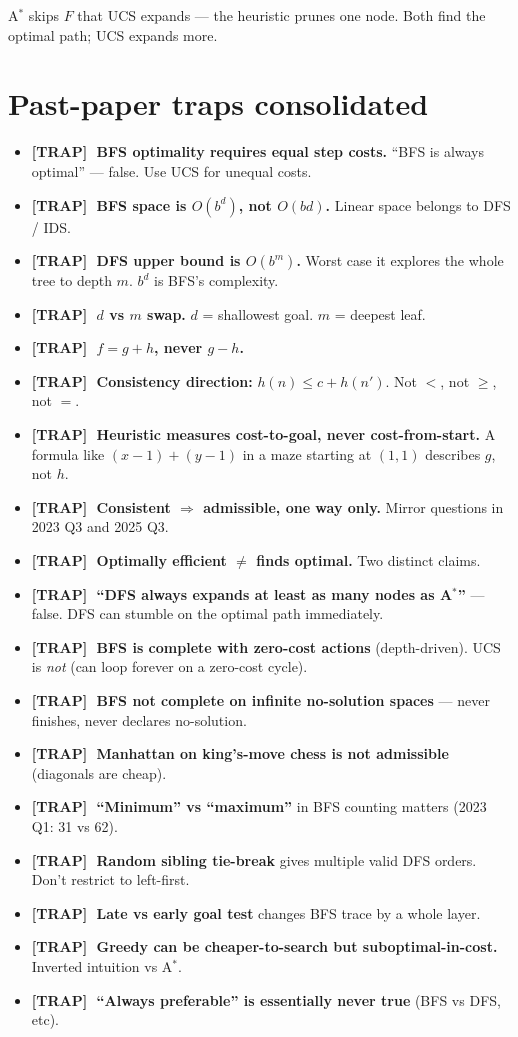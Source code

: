 \documentclass[11pt, a4paper]{article}
\newcommand{\trapflag}{\textcolor{trapBd}{\textbf{[TRAP]}}\,}
\begin{document}
A$^{*}$ skips $F$ that UCS expands --- the heuristic prunes one node. Both find the optimal path; UCS expands more.

\section{Past-paper traps consolidated}

\begin{itemize}
  \item \trapflag\ \textbf{BFS optimality requires equal step costs.} ``BFS is always optimal'' --- false. Use UCS for unequal costs.
  \item \trapflag\ \textbf{BFS space is $O(b^d)$, not $O(bd)$.} Linear space belongs to DFS / IDS.
  \item \trapflag\ \textbf{DFS upper bound is $O(b^m)$.} Worst case it explores the whole tree to depth $m$. $b^d$ is BFS's complexity.
  \item \trapflag\ \textbf{$d$ vs $m$ swap.} $d$ = shallowest goal. $m$ = deepest leaf.
  \item \trapflag\ \textbf{$f = g + h$, never $g - h$.}
  \item \trapflag\ \textbf{Consistency direction:} $h(n) \le c + h(n')$. Not $<$, not $\ge$, not $=$.
  \item \trapflag\ \textbf{Heuristic measures cost-to-goal, never cost-from-start.} A formula like $(x{-}1)+(y{-}1)$ in a maze starting at $(1,1)$ describes $g$, not $h$.
  \item \trapflag\ \textbf{Consistent $\Rightarrow$ admissible, one way only.} Mirror questions in 2023 Q3 and 2025 Q3.
  \item \trapflag\ \textbf{Optimally efficient $\neq$ finds optimal.} Two distinct claims.
  \item \trapflag\ \textbf{``DFS always expands at least as many nodes as A$^{*}$''} --- false. DFS can stumble on the optimal path immediately.
  \item \trapflag\ \textbf{BFS is complete with zero-cost actions} (depth-driven). UCS is \emph{not} (can loop forever on a zero-cost cycle).
  \item \trapflag\ \textbf{BFS not complete on infinite no-solution spaces} --- never finishes, never declares no-solution.
  \item \trapflag\ \textbf{Manhattan on king's-move chess is not admissible} (diagonals are cheap).
  \item \trapflag\ \textbf{``Minimum'' vs ``maximum''} in BFS counting matters (2023 Q1: 31 vs 62).
  \item \trapflag\ \textbf{Random sibling tie-break} gives multiple valid DFS orders. Don't restrict to left-first.
  \item \trapflag\ \textbf{Late vs early goal test} changes BFS trace by a whole layer.
  \item \trapflag\ \textbf{Greedy can be cheaper-to-search but suboptimal-in-cost.} Inverted intuition vs A$^{*}$.
  \item \trapflag\ \textbf{``Always preferable'' is essentially never true} (BFS vs DFS, etc).
\end{itemize}
\end{document}

